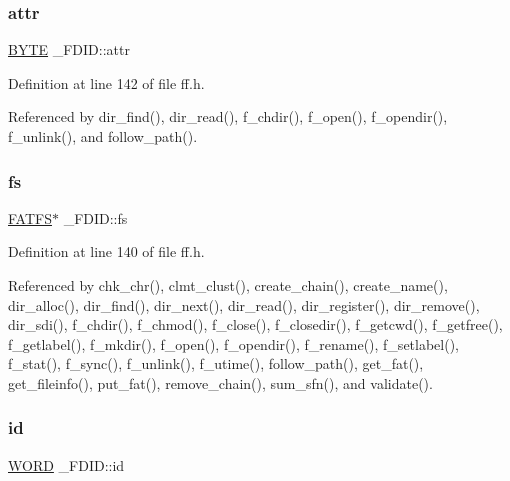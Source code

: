 \subsubsection{\texorpdfstring{attr}{attr}}
{\footnotesize\ttfamily \hyperlink{integer_8h_a4ae1dab0fb4b072a66584546209e7d58}{B\+Y\+TE} \+\_\+\+F\+D\+I\+D\+::attr}



Definition at line 142 of file ff.\+h.



Referenced by dir\+\_\+find(), dir\+\_\+read(), f\+\_\+chdir(), f\+\_\+open(), f\+\_\+opendir(), f\+\_\+unlink(), and follow\+\_\+path().

\mbox{\label{struct__FDID_aefa4597d88e54bace32e6c15e11d9610}} 
\subsubsection{\texorpdfstring{fs}{fs}}
{\footnotesize\ttfamily \hyperlink{structFATFS}{F\+A\+T\+FS}$\ast$ \+\_\+\+F\+D\+I\+D\+::fs}



Definition at line 140 of file ff.\+h.



Referenced by chk\+\_\+chr(), clmt\+\_\+clust(), create\+\_\+chain(), create\+\_\+name(), dir\+\_\+alloc(), dir\+\_\+find(), dir\+\_\+next(), dir\+\_\+read(), dir\+\_\+register(), dir\+\_\+remove(), dir\+\_\+sdi(), f\+\_\+chdir(), f\+\_\+chmod(), f\+\_\+close(), f\+\_\+closedir(), f\+\_\+getcwd(), f\+\_\+getfree(), f\+\_\+getlabel(), f\+\_\+mkdir(), f\+\_\+open(), f\+\_\+opendir(), f\+\_\+rename(), f\+\_\+setlabel(), f\+\_\+stat(), f\+\_\+sync(), f\+\_\+unlink(), f\+\_\+utime(), follow\+\_\+path(), get\+\_\+fat(), get\+\_\+fileinfo(), put\+\_\+fat(), remove\+\_\+chain(), sum\+\_\+sfn(), and validate().

\mbox{\label{struct__FDID_a363d7bdab408418b911ac1502bc22ea6}} 
\subsubsection{\texorpdfstring{id}{id}}
{\footnotesize\ttfamily \hyperlink{integer_8h_a197942eefa7db30960ae396d68339b97}{W\+O\+RD} \+\_\+\+F\+D\+I\+D\+::id}



